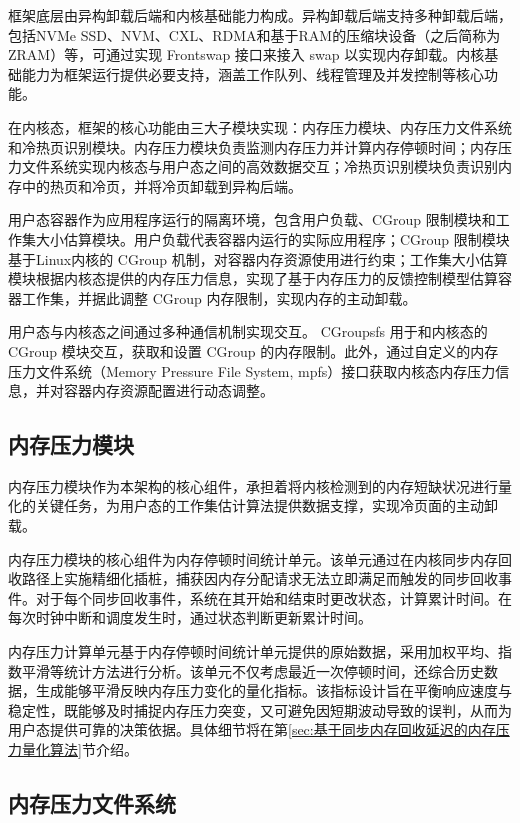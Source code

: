 框架底层由异构卸载后端和内核基础能力构成。异构卸载后端支持多种卸载后端，包括NVMe SSD、NVM、CXL、RDMA和基于RAM的压缩块设备（之后简称为ZRAM）等，可通过实现 Frontswap 接口来接入 swap 以实现内存卸载。内核基础能力为框架运行提供必要支持，涵盖工作队列、线程管理及并发控制等核心功能。


在内核态，框架的核心功能由三大子模块实现：内存压力模块、内存压力文件系统和冷热页识别模块。内存压力模块负责监测内存压力并计算内存停顿时间；内存压力文件系统实现内核态与用户态之间的高效数据交互；冷热页识别模块负责识别内存中的热页和冷页，并将冷页卸载到异构后端。

用户态容器作为应用程序运行的隔离环境，包含用户负载、CGroup 限制模块和工作集大小估算模块。用户负载代表容器内运行的实际应用程序；CGroup 限制模块基于Linux内核的 CGroup 机制，对容器内存资源使用进行约束；工作集大小估算模块根据内核态提供的内存压力信息，实现了基于内存压力的反馈控制模型估算容器工作集，并据此调整 CGroup 内存限制，实现内存的主动卸载。

用户态与内核态之间通过多种通信机制实现交互。 CGroupsfs 用于和内核态的 CGroup 模块交互，获取和设置 CGroup 的内存限制。此外，通过自定义的内存压力文件系统（Memory Pressure File System, mpfs）接口获取内核态内存压力信息，并对容器内存资源配置进行动态调整。

\subsection{内存压力模块}

内存压力模块作为本架构的核心组件，承担着将内核检测到的内存短缺状况进行量化的关键任务，为用户态的工作集估计算法提供数据支撑，实现冷页面的主动卸载。

内存压力模块的核心组件为内存停顿时间统计单元。该单元通过在内核同步内存回收路径上实施精细化插桩，捕获因内存分配请求无法立即满足而触发的同步回收事件。对于每个同步回收事件，系统在其开始和结束时更改状态，计算累计时间。在每次时钟中断和调度发生时，通过状态判断更新累计时间。

内存压力计算单元基于内存停顿时间统计单元提供的原始数据，采用加权平均、指数平滑等统计方法进行分析。该单元不仅考虑最近一次停顿时间，还综合历史数据，生成能够平滑反映内存压力变化的量化指标。该指标设计旨在平衡响应速度与稳定性，既能够及时捕捉内存压力突变，又可避免因短期波动导致的误判，从而为用户态提供可靠的决策依据。具体细节将在第\ref{sec:基于同步内存回收延迟的内存压力量化算法}节介绍。

\subsection{内存压力文件系统}

